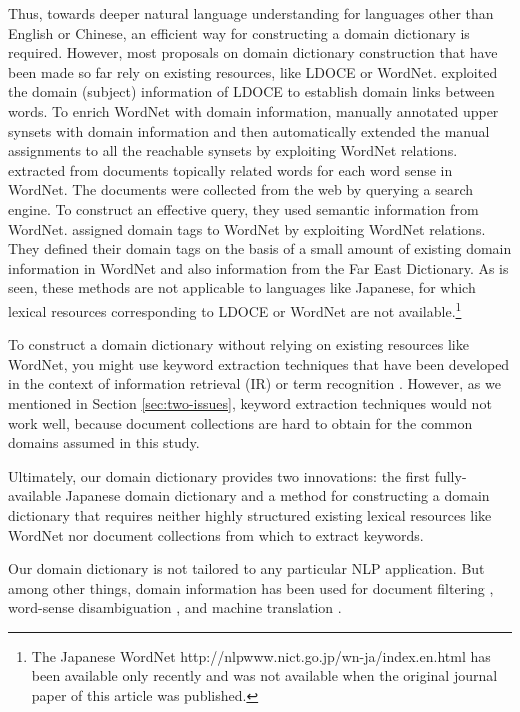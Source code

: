 \documentclass[english]{jnlp_1.4_rep}
\begin{document}
Thus,
towards deeper natural language understanding for languages other than
English or Chinese, an efficient way for
constructing a domain dictionary is required.
However,
most proposals on domain dictionary construction that have been
made so far rely on existing resources, like LDOCE or WordNet.
 exploited the domain
(subject) information of LDOCE to establish domain links between words.
To enrich WordNet with domain information,
manually annotated upper synsets with domain information and then
automatically extended the manual assignments to all the reachable synsets
by exploiting WordNet relations.
 extracted
from documents topically related words for each word sense in WordNet.
The documents were collected from the web by querying a search
engine.
To construct an effective query, they
used semantic information from WordNet.
assigned domain tags to WordNet by exploiting WordNet relations.
They defined their domain tags on the basis of 
a small amount of existing domain information in WordNet
and also information from the Far East Dictionary.
As is seen, these methods are
not applicable to languages like Japanese, for which lexical resources
corresponding to LDOCE or WordNet are not available.\footnote{
The Japanese WordNet
http://nlpwww.nict.go.jp/wn-ja/index.en.html
has been available only recently and was not available when the
original journal paper of this article was published.
}

To construct a domain dictionary without relying on existing resources
like WordNet, you might use keyword extraction techniques that have
been developed in the context of information retrieval (IR) or term
recognition
\cite[and so on]
{Frantzi:Ananiadou:Tsujii:1998,Hisamitsu:Tsujii:2003,Nakagawa:Mori:Yumoto:2003}.
However, as we mentioned in Section \ref{sec:two-issues}, keyword extraction
techniques 
would not work well, because document collections
are hard to obtain for the common domains assumed in this
study.

Ultimately, our domain dictionary provides two innovations:
the first fully-available Japanese domain dictionary and a method for
constructing a domain dictionary that requires neither highly structured
existing lexical resources like WordNet nor document collections from
which to extract keywords.

Our domain dictionary is not tailored to any particular NLP application.
But among other things, domain information has been used for
document filtering \cite{Liddy:Paik:1993},
word-sense disambiguation \cite{Rigau:Atserias:Agirre:1997}, and
machine translation
\cite{Yoshimoto:Kinoshita:Shimazu:1997,Lange:Yang:1999}.
\end{document}
